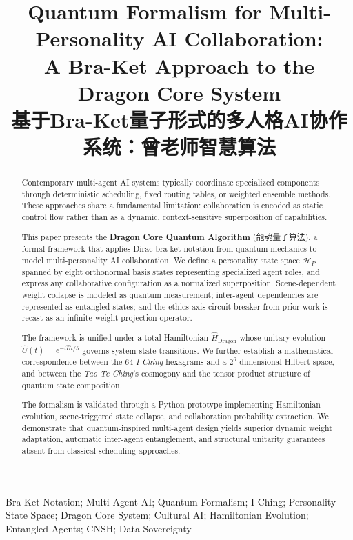\documentclass[conference]{IEEEtran}
\title{
  Quantum Formalism for Multi-Personality AI Collaboration:\\
  A Bra-Ket Approach to the Dragon Core System\\
  \large 基于Bra-Ket量子形式的多人格AI协作系统：曾老师智慧算法
}
\author{
  \IEEEauthorblockN{Lucky (诸葛鑫)\ \ UID9622}
  \IEEEauthorblockA{
    Chinese Natural Semantic Humanity (CNSH) Framework\\
    Dragon Core System / 龍魂系统\\
    GPG: \texttt{A2D0092CEE2E5BA87035600924C3704A8CC26D5F}\\
    Email: fireroot.lad@outlook.com
  }
}
\begin{document}
\maketitle

\begin{abstract}
Contemporary multi-agent AI systems typically coordinate
specialized components through deterministic scheduling,
fixed routing tables, or weighted ensemble methods.
These approaches share a fundamental limitation: collaboration
is encoded as static control flow rather than as a dynamic,
context-sensitive superposition of capabilities.

This paper presents the \textbf{Dragon Core Quantum Algorithm}
(龍魂量子算法), a formal framework that applies Dirac bra-ket
notation from quantum mechanics to model multi-personality AI
collaboration. We define a personality state space
$\mathcal{H}_P$ spanned by eight orthonormal basis states
representing specialized agent roles, and express any
collaborative configuration as a normalized superposition.
Scene-dependent weight collapse is modeled as quantum
measurement; inter-agent dependencies are represented as
entangled states; and the ethics-axis circuit breaker from
prior work is recast as an infinite-weight projection operator.

The framework is unified under a total Hamiltonian
$\hat{H}_{\text{Dragon}}$ whose unitary evolution
$\hat{U}(t) = e^{-i\hat{H}t/\hbar}$ governs system state
transitions. We further establish a mathematical correspondence
between the 64 \textit{I Ching} hexagrams and a
$2^6$-dimensional Hilbert space, and between the
\textit{Tao Te Ching}'s cosmogony and the tensor product
structure of quantum state composition.

The formalism is validated through a Python prototype
implementing Hamiltonian evolution, scene-triggered state
collapse, and collaboration probability extraction. We
demonstrate that quantum-inspired multi-agent design
yields superior dynamic weight adaptation, automatic
inter-agent entanglement, and structural unitarity
guarantees absent from classical scheduling approaches.
\end{abstract}

\begin{IEEEkeywords}
Bra-Ket Notation; Multi-Agent AI; Quantum Formalism;
I Ching; Personality State Space; Dragon Core System;
Cultural AI; Hamiltonian Evolution; Entangled Agents;
CNSH; Data Sovereignty
\end{IEEEkeywords}
\end{document}
